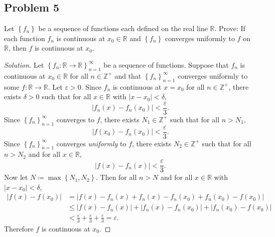 \documentclass[12pt]{article}
\newcommand{\z}{\mathbb{Z}}
\newcommand{\real}{\mathbb{R}}
\newcommand{\ita}[1]{\textit{#1}}
\newcommand\setb[1]{\left \{ #1 \right \}}
\newcommand{\eps}{\varepsilon}
\theoremstyle{definition}
\begin{document}
\subsection{Problem 5}
Let $\setb{f_n}$ be a sequence of functions each defined on the real line $\real$. Prove: If each function $f_n$ is continuous at $x_0 \in \real$ and $\setb{ f_n }$ converges uniformly to $f$ on $\real$, then $f$ is continuous at $x_0$.
\begin{proof}[Solution]
    Let $\setb{ f_n : \real \to \real }_{n=1}^{\infty}$ be a sequence of functions. Suppose that $f_n$ is continuous at $x_0 \in \real$ for all $n \in \z^+$ and that $\setb{ f_n }_{n=1}^{\infty}$ converges uniformly to some $f : \real \to \real$. Let $\eps > 0$. Since $f_n$ is continuous at $x = x_0$ for all $n \in \z^+$, there exists $\delta > 0$ such that for all $x \in \real$ with $|x - x_0| < \delta$,
    \[
        |f_n(x) - f_n(x_0)| < \frac{\eps}{3}.
    \]
    Since $\setb{ f_n }_{n=1}^{\infty}$ converges to $f$, there exists $N_1 \in \z^+$ such that for all $n > N_1$, 
    \[
        | f(x_0) - f_n(x_0) | < \frac{\eps}{3}.
    \]
    Since $\setb{ f_n }_{n=1}^{\infty}$ converges \ita{uniformly} to $f$, there exists $N_2 \in \z^+$ such that for all $n > N_2$ and for all $x \in \real$,
    \[
        | f(x) - f_n(x) | < \frac{\eps}{3}.
    \]
    Now let $N \coloneqq \max \setb{ N_1 , N_2 }$. Then for all $n > N$ and for all $x \in \real$ with $|x - x_0| < \delta$, 
    \begin{align*}
        | f(x) - f(x_0) | & = | f(x) - f_n(x) + f_n(x) - f_n(x_0) + f_n(x_0) - f(x_0) | \\
        & \leq | f(x) - f_n(x) | + | f_n(x) - f_n(x_0) | + | f_n(x_0) - f(x_0) | \\
        & < \frac{\eps}{3} + \frac{\eps}{3} + \frac{\eps}{3} = \eps.
    \end{align*}
    Therefore $f$ is continuous at $x_0$.
\end{proof}
\end{document}
